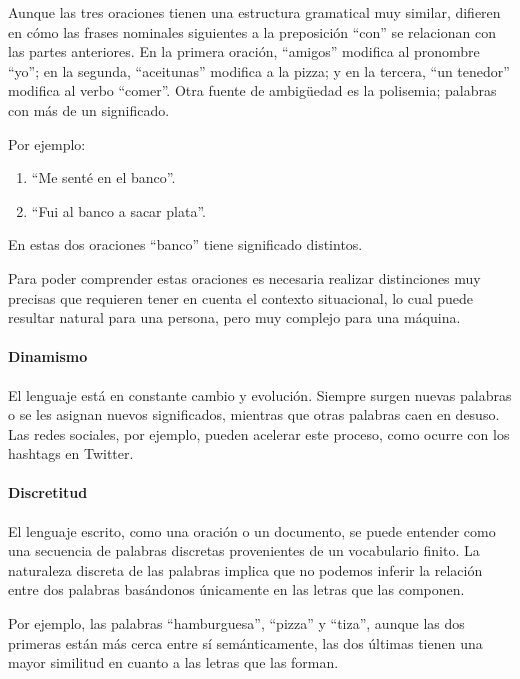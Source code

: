 Aunque las tres oraciones tienen una estructura gramatical muy similar, difieren en cómo las frases nominales siguientes a la preposición ``con'' se relacionan con las partes anteriores. En la primera oración, ``amigos'' modifica al pronombre ``yo''; en la segunda, ``aceitunas'' modifica a la pizza; y en la tercera, ``un tenedor'' modifica al verbo ``comer''. Otra fuente de ambigüedad es la polisemia; palabras con más de un significado.

\begin{example}
Por ejemplo:
\begin{enumerate}
 \item ``Me senté en el banco''.
 \item ``Fui al banco a sacar plata''.
\end{enumerate}
 En estas dos oraciones ``banco'' tiene significado distintos. 
\end{example}

Para poder comprender estas oraciones es necesaria realizar  distinciones muy precisas que requieren tener en cuenta el contexto situacional, lo cual puede resultar natural para una persona, pero muy complejo para una máquina.

\paragraph{Dinamismo}

El lenguaje está en constante cambio y evolución. Siempre surgen nuevas palabras o se les asignan nuevos significados, mientras que otras palabras caen en desuso. Las redes sociales, por ejemplo, pueden acelerar este proceso, como ocurre con los hashtags en Twitter.

\paragraph{Discretitud}

El lenguaje escrito, como una oración o un documento, se puede entender como una secuencia de palabras discretas provenientes de un vocabulario finito. La naturaleza discreta de las palabras implica que no podemos inferir la relación entre dos palabras basándonos únicamente en las letras que las componen. 

\begin{example}
Por ejemplo, las palabras ``hamburguesa'', ``pizza'' y ``tiza'', aunque las dos primeras están más cerca entre sí semánticamente, las dos últimas tienen una mayor similitud en cuanto a las letras que las forman. 
\end{example}


